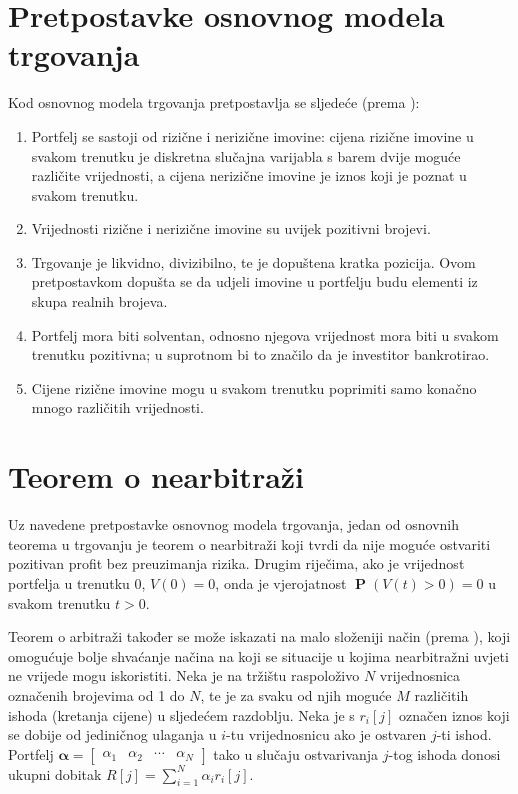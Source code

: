 \documentclass[lmodern, utf8, diplomski, numeric]{fer}
\newcommand{\matr}[1]{\mathbold{#1}}
\newcommand{\prob}[1]{\operatorname{\mathbf{P}}\q(#1\w)}
\newcommand{\q}{\left}
\newcommand{\w}{\right}
\begin{document}
  \section{Pretpostavke osnovnog modela trgovanja}
  Kod osnovnog modela trgovanja pretpostavlja se sljedeće (prema \citep{finmat}):
  \begin{enumerate}
    \item Portfelj se sastoji od rizične i nerizične imovine: cijena rizične imovine u svakom trenutku je diskretna slučajna varijabla s barem dvije moguće različite vrijednosti, a cijena nerizične imovine je iznos koji je poznat u svakom trenutku.
    
    \item Vrijednosti rizične i nerizične imovine su uvijek pozitivni brojevi.
    
    \item Trgovanje je likvidno, divizibilno, te je dopuštena kratka pozicija.
    Ovom pretpostavkom dopušta se da udjeli imovine u portfelju budu elementi iz skupa realnih brojeva.
    
    \item Portfelj mora biti solventan, odnosno njegova vrijednost mora biti u svakom trenutku pozitivna; u suprotnom bi to značilo da je investitor bankrotirao.
    
    \item Cijene rizične imovine mogu u svakom trenutku poprimiti samo konačno mnogo različitih vrijednosti.
  \end{enumerate}
  
  \section{Teorem o nearbitraži}
  Uz navedene pretpostavke osnovnog modela trgovanja, jedan od osnovnih teorema u trgovanju je teorem o nearbitraži koji tvrdi da nije moguće ostvariti pozitivan profit bez preuzimanja rizika.
  Drugim riječima, ako je vrijednost portfelja u trenutku 0, $V\q(0\w) = 0$, onda je vjerojatnost $\prob{V\q(t\w) > 0} = 0$ u svakom trenutku $t > 0$.
  
  Teorem o arbitraži također se može iskazati na malo složeniji način (prema \citep{ross2011elementary}), koji omogućuje bolje shvaćanje načina na koji se situacije u kojima nearbitražni uvjeti ne vrijede mogu iskoristiti.
  Neka je na tržištu raspoloživo $N$ vrijednosnica označenih brojevima od 1 do $N$, te je za svaku od njih moguće $M$ različitih ishoda (kretanja cijene) u sljedećem razdoblju.
  Neka je s $r_i\q[j\w]$ označen iznos koji se dobije od jediničnog ulaganja u $i$-tu vrijednosnicu ako je ostvaren $j$-ti ishod.
  Portfelj $\matr{\alpha} = \begin{bmatrix} \alpha_1 & \alpha_2 & \cdots & \alpha_N
  \end{bmatrix}$ tako u slučaju ostvarivanja $j$-tog ishoda donosi ukupni dobitak $R\q[j\w] = \sum_{i=1}^{N} \alpha_i r_i \q[j\w]$.
  
\end{document}
